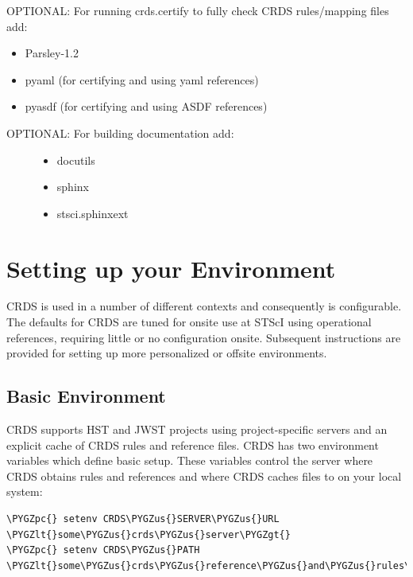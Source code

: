 \documentclass[letterpaper,10pt,english]{sphinxmanual}
\def\PYGZus{\char`\_}
\def\PYGZlt{\char`\<}
\def\PYGZgt{\char`\>}
\def\PYGZpc{\char`\%}
\begin{document}
OPTIONAL: For running crds.certify to fully check CRDS rules/mapping files add:
\begin{itemize}
\item {} 
Parsley-1.2

\item {} 
pyaml  (for certifying and using yaml references)

\item {} 
pyasdf (for certifying and using ASDF references)

\end{itemize}
\begin{description}
\item[{OPTIONAL: For building documentation add:}] \leavevmode\begin{itemize}
\item {} 
docutils

\item {} 
sphinx

\item {} 
stsci.sphinxext

\end{itemize}

\end{description}


\chapter{Setting up your Environment}
\label{installation:setting-up-your-environment}
CRDS is used in a number of different contexts and consequently is configurable.   The defaults for
CRDS are tuned for onsite use at STScI using operational references,  requiring little or no configuration onsite.
Subsequent instructions are provided for setting up more personalized or offsite environments.


\section{Basic Environment}
\label{installation:basic-environment}
CRDS supports HST and JWST projects using project-specific servers and an explicit cache of CRDS rules and reference
files.   CRDS has two environment variables which define basic setup.   These variables control the server where CRDS
obtains rules and references and where CRDS caches files to on your local system:

\begin{Verbatim}[commandchars=\\\{\}]
\PYGZpc{} setenv CRDS\PYGZus{}SERVER\PYGZus{}URL  \PYGZlt{}some\PYGZus{}crds\PYGZus{}server\PYGZgt{}
\PYGZpc{} setenv CRDS\PYGZus{}PATH        \PYGZlt{}some\PYGZus{}crds\PYGZus{}reference\PYGZus{}and\PYGZus{}rules\PYGZus{}cache\PYGZus{}directory\PYGZgt{}
\end{Verbatim}
\end{document}
